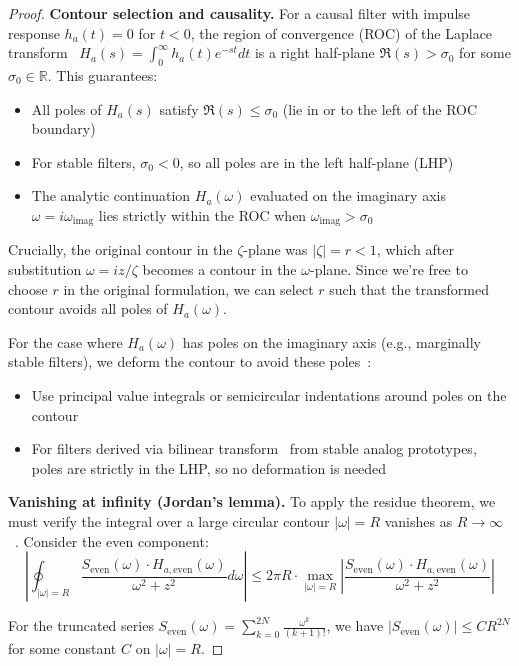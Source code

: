 \begin{theorem}
\begin{proof}
\textbf{Contour selection and causality.} For a causal filter with impulse response $h_a(t) = 0$ for $t < 0$, the region of convergence (ROC) of the Laplace transform~\cite{OppenheimDSP} $H_a(s) = \int_0^\infty h_a(t) e^{-st} dt$ is a right half-plane $\Re(s) > \sigma_0$ for some $\sigma_0 \in \mathbb{R}$. This guarantees:
\begin{itemize}
\item All poles of $H_a(s)$ satisfy $\Re(s) \leq \sigma_0$ (lie in or to the left of the ROC boundary)
\item For stable filters, $\sigma_0 < 0$, so all poles are in the left half-plane (LHP)
\item The analytic continuation $H_a(\omega)$ evaluated on the imaginary axis $\omega = i\omega_{\text{imag}}$ lies strictly within the ROC when $\omega_{\text{imag}} > \sigma_0$
\end{itemize}

Crucially, the original contour in the $\zeta$-plane was $|\zeta| = r < 1$, which after substitution $\omega = iz/\zeta$ becomes a contour in the $\omega$-plane. Since we're free to choose $r$ in the original formulation, we can select $r$ such that the transformed contour avoids all poles of $H_a(\omega)$.

For the case where $H_a(\omega)$ has poles on the imaginary axis (e.g., marginally stable filters), we deform the contour to avoid these poles~\cite{Ahlfors1979}:
\begin{itemize}
\item Use principal value integrals or semicircular indentations around poles on the contour
\item For filters derived via bilinear transform~\cite{OppenheimDSP,Kailath2000} from stable analog prototypes, poles are strictly in the LHP, so no deformation is needed
\end{itemize}

\textbf{Vanishing at infinity (Jordan's lemma).} To apply the residue theorem, we must verify the integral over a large circular contour $|\omega| = R$ vanishes as $R \to \infty$~\cite{Ahlfors1979,Stein2003}. Consider the even component:
\[
\left|\oint_{|\omega|=R} \frac{S_{\text{even}}(\omega) \cdot H_{a,\text{even}}(\omega)}{\omega^2+z^2} d\omega\right| \leq 2\pi R \cdot \max_{|\omega|=R} \left|\frac{S_{\text{even}}(\omega) \cdot H_{a,\text{even}}(\omega)}{\omega^2+z^2}\right|
\]

For the truncated series $S_{\text{even}}(\omega) = \sum_{k=0}^{2N} \frac{\omega^k}{(k+1)!}$, we have $|S_{\text{even}}(\omega)| \leq C R^{2N}$ for some constant $C$ on $|\omega| = R$.


\end{proof}
\end{theorem}
